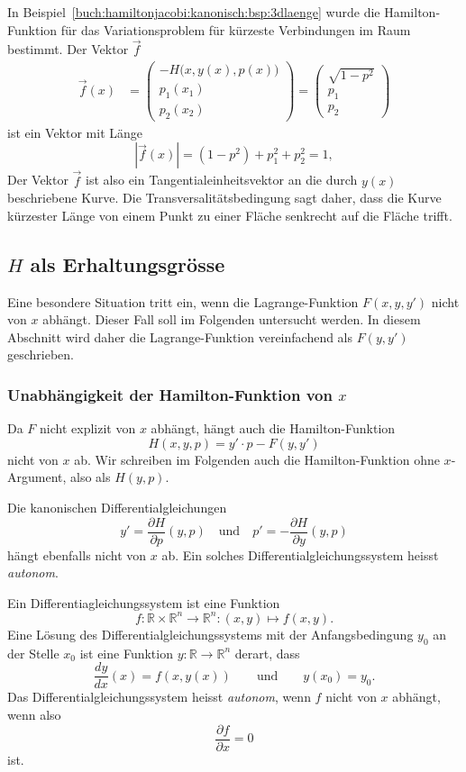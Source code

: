 \begin{beispiel}
In Beispiel~\ref{buch:hamiltonjacobi:kanonisch:bsp:3dlaenge} wurde
die Hamilton-Funktion für das Variationsproblem für kürzeste Verbindungen
im Raum bestimmt.
Der Vektor $\vec{f}$ 
\begin{align*}
\vec{f}(x)
&=
\begin{pmatrix}
-H\bigl(x,y(x),p(x)\bigr)\\
p_1(x_1)\\
p_2(x_2)
\end{pmatrix}
=
\begin{pmatrix}
\sqrt{1-p^2}\\
p_1\\
p_2
\end{pmatrix}
\end{align*}
ist ein Vektor mit Länge
\[
|\vec{f}(x)|
=
(1-p^2) + p_1^2+p_2^2
=
1,
\]
Der Vektor $\vec{f}$ ist also ein Tangentialeinheitsvektor an die
durch $y(x)$ beschriebene Kurve.
Die Transversalitätsbedingung sagt daher, dass die Kurve kürzester
Länge von einem Punkt zu einer Fläche senkrecht auf die Fläche trifft.
\end{beispiel}

%
%
\subsection{$H$ als Erhaltungsgrösse}
Eine besondere Situation tritt ein, wenn die Lagrange-Funktion $F(x,y,y')$
nicht von $x$ abhängt.
Dieser Fall soll im Folgenden untersucht werden.
In diesem Abschnitt wird daher die
Lagrange-Funktion vereinfachend als $F(y,y')$ geschrieben.

%
%
\subsubsection{Unabhängigkeit der Hamilton-Funktion von $x$}
Da $F$ nicht explizit von $x$ abhängt, hängt auch die
Hamilton-Funktion
\[
H(x,y,p)
=
y'\cdot p - F(y,y')
\]
nicht von $x$ ab.
Wir schreiben im Folgenden auch die Hamilton-Funktion ohne $x$-Argument,
also als $H(y,p)$.

Die kanonischen Differentialgleichungen
\[
y' = \frac{\partial H}{\partial p}(y,p)
\quad\text{und}\quad
p' = -\frac{\partial H}{\partial y}(y,p)
\]
hängt ebenfalls nicht von $x$ ab.
Ein solches Differentialgleichungssystem heisst {\em autonom}.
%

\begin{definition}
Ein Differentiagleichungssystem ist eine Funktion 
\[
f\colon \mathbb{R}\times \mathbb{R}^n\to\mathbb{R}^n
:
(x,y)\mapsto f(x,y).
\]
Eine Lösung des Differentialgleichungssystems mit der Anfangsbedingung
$y_0$ an der Stelle $x_0$ ist eine Funktion
$y\colon\mathbb{R}\to\mathbb{R}^n$ derart, dass 
\[
\frac{dy}{dx}(x)
=
f(x,y(x))
\qquad\text{und}\qquad
y(x_0)=y_0.
\]
Das Differentialgleichungssystem heisst {\em autonom}, wenn $f$ nicht von
%
$x$ abhängt, wenn also
\[
\frac{\partial f}{\partial x} = 0
\]
ist.
\end{definition}

